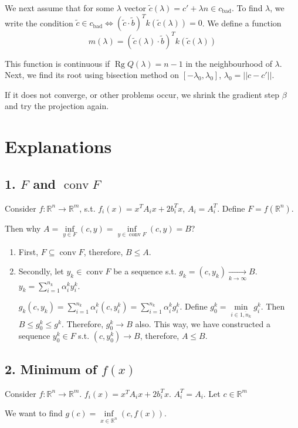 \documentclass[a4paper]{article}
\DeclareMathOperator{\conv}{conv}
\DeclareMathOperator{\Rg}{Rg}
\newcommand{\cbad}{c_{\mathrm{bad}}}
\begin{document}
We next assume that for some $\lambda$ vector $\tilde{c}(\lambda)=c'+\lambda n\in\cbad$. To find $\lambda$, we write the condition $\tilde{c}\in\cbad\Leftrightarrow (\tilde{c}\cdot \tilde{b})^T k(\tilde{c}(\lambda))=0$. We define a function
$$m(\lambda)=(\tilde{c}(\lambda)\cdot \tilde{b})^T k(\tilde{c}(\lambda))$$

This function is continuous if $\Rg Q(\lambda)=n-1$ in the neighbourhood of $\lambda$. Next, we find its root using bisection method on $[-\lambda_0,\lambda_0]$, $\lambda_0=||c-c'||$.

If it does not converge, or other problems occur, we shrink the gradient step $\beta$ and try the projection again.

\section*{Explanations}
\subsection*{1. $F$ and $\conv F$}
Consider $f\colon \mathbb{R}^n\to\mathbb{R}^m$, s.t. $f_i(x)=x^TA_ix+2b_i^Tx$, $A_i=A_i^T$. Define $F=f(\mathbb{R}^n)$.

Then why $A=\inf \limits_{y\in F} (c,y)=\inf\limits_{y\in\conv F} (c,y)=B$?

\begin{enumerate}
\item First, $F\subseteq \conv F$, therefore, $B\leqslant A$.
\item Secondly, let $y_k\in \conv F$ be a sequence s.t. $g_k=(c,y_k)\underset{k\to\infty}{\longrightarrow} B$. $y_k=\sum\limits_{i=1}^{n_k}\alpha^k_iy^k_i$.

$g_k(c,y_k)=\sum\limits_{i=1}^{n_k}\alpha^k_i(c,y^k_i)=\sum\limits_{i=1}^{n_k}\alpha^k_i g^k_i$. Define $g^k_0=\min\limits_{i\in \overline{1,n_k}}g^k_i$. Then $B\leqslant g^k_0\leqslant g^k$. Therefore, $g^k_0\to B$ also. This way, we have constructed a sequence $y^k_0\in F$ s.t. $(c,y^k_0)\to B$, therefore, $A\leqslant B$.
\end{enumerate}

\subsection*{2. Minimum of $f(x)$}
Consider $f\colon \mathbb{R}^n\to\mathbb{R}^m$. $f_i(x)=x^TA_ix+2b_i^Tx$. $A_i^T=A_i$. Let $c\in\mathbb{R}^m$

We want to find
$g(c)=\inf\limits_{x\in\mathbb{R}^n} (c,f(x))$.
\end{document}
